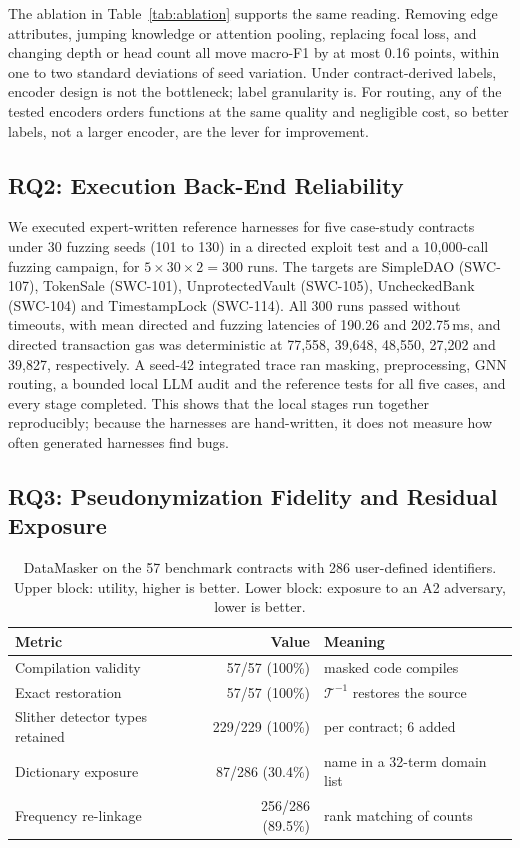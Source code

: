 \documentclass[runningheads]{llncs}
\begin{document}
The ablation in Table~\ref{tab:ablation} supports the same reading. Removing edge attributes, jumping knowledge or attention pooling, replacing focal loss, and changing depth or head count all move macro-F1 by at most 0.16 points, within one to two standard deviations of seed variation. Under contract-derived labels, encoder design is not the bottleneck; label granularity is. For routing, any of the tested encoders orders functions at the same quality and negligible cost, so better labels, not a larger encoder, are the lever for improvement.

\subsection{RQ2: Execution Back-End Reliability}
\label{sec:rq2}

We executed expert-written reference harnesses for five case-study contracts under 30 fuzzing seeds (101 to 130) in a directed exploit test and a 10,000-call fuzzing campaign, for $5\times30\times2=300$ runs. The targets are SimpleDAO (SWC-107), TokenSale (SWC-101), UnprotectedVault (SWC-105), UncheckedBank (SWC-104) and TimestampLock (SWC-114). All 300 runs passed without timeouts, with mean directed and fuzzing latencies of 190.26 and 202.75\,ms, and directed transaction gas was deterministic at 77,558, 39,648, 48,550, 27,202 and 39,827, respectively. A seed-42 integrated trace ran masking, preprocessing, GNN routing, a bounded local LLM audit and the reference tests for all five cases, and every stage completed. This shows that the local stages run together reproducibly; because the harnesses are hand-written, it does not measure how often generated harnesses find bugs.

\subsection{RQ3: Pseudonymization Fidelity and Residual Exposure}
\label{sec:rq3}

\begin{table}[t]
\centering
\small
\caption{DataMasker on the 57 benchmark contracts with 286 user-defined identifiers. Upper block: utility, higher is better. Lower block: exposure to an A2 adversary, lower is better.}
\label{tab:datamasker_eval}
\begin{tabular}{lrl}
\toprule
Metric & Value & Meaning \\
\midrule
Compilation validity             & 57/57 (100\%)   & masked code compiles \\
Exact restoration                & 57/57 (100\%)   & $\mathcal{T}^{-1}$ restores the source \\
Slither detector types retained  & 229/229 (100\%) & per contract; 6 added \\
\midrule
Dictionary exposure              & 87/286 (30.4\%)  & name in a 32-term domain list \\
Frequency re-linkage             & 256/286 (89.5\%) & rank matching of counts \\
\bottomrule
\end{tabular}
\end{table}
\end{document}
